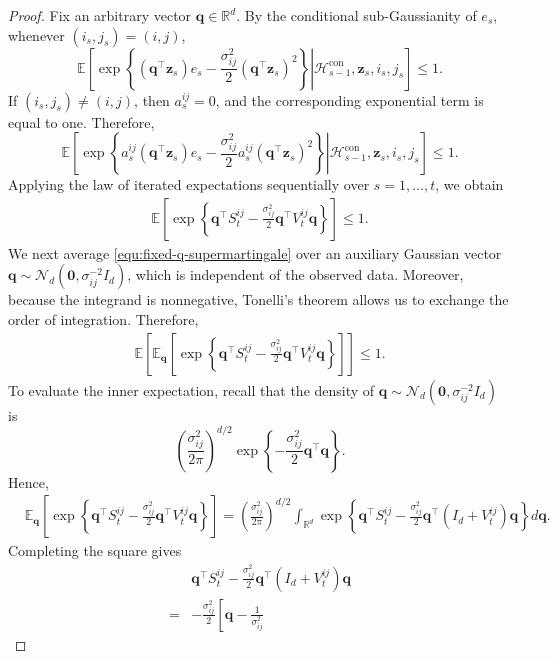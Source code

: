 \documentclass[12pt]{article}
\begin{document}
\begin{proof}
Fix an arbitrary vector $\bm q\in\mathbb R^d$. By the conditional
sub-Gaussianity of $e_s$, whenever $(i_s,j_s)=(i,j)$,
\[
\mathbb E\left[
\left.
\exp\left\{
(\bm q^\top\bm z_s)e_s
-
\frac{\sigma_{ij}^2}{2}
(\bm q^\top\bm z_s)^2
\right\}
\right|
\mathcal H_{s-1}^{\mathrm{con}},
\bm z_s,
i_s,
j_s
\right]
\le
1.
\]
If $(i_s,j_s)\neq(i,j)$, then $a_s^{ij}=0$, and the corresponding
exponential term is equal to one. Therefore,
\[
\mathbb E\left[
\left.
\exp\left\{
a_s^{ij}(\bm q^\top\bm z_s)e_s
-
\frac{\sigma_{ij}^2}{2}
a_s^{ij}(\bm q^\top\bm z_s)^2
\right\}
\right|
\mathcal H_{s-1}^{\mathrm{con}},
\bm z_s,
i_s,
j_s
\right]
\le
1.
\]
Applying the law of iterated expectations sequentially over
$s=1,\ldots,t$, we obtain
\begin{align}
\label{equ:fixed-q-supermartingale}
\mathbb E\left[
\exp\left\{
\bm q^\top S_t^{ij}
-
\frac{\sigma_{ij}^2}{2}
\bm q^\top V_t^{ij}\bm q
\right\}
\right]
\le
1.
\end{align}
We next average \eqref{equ:fixed-q-supermartingale} over an auxiliary Gaussian vector $\bm q
\sim
\mathcal N_d
\left(
\bm 0,
\sigma_{ij}^{-2}I_d
\right)$,
which is independent of the observed data. Moreover, because the integrand is nonnegative, Tonelli's theorem allows us to exchange the order of integration. Therefore,
\begin{align}
\label{equ:mixture-expectation}
\mathbb E\left[
\mathbb E_{\bm q}
\left[
\exp\left\{
\bm q^\top S_t^{ij}
-
\frac{\sigma_{ij}^2}{2}
\bm q^\top V_t^{ij}\bm q
\right\}
\right]
\right]
\le
1.
\end{align}
To evaluate the inner expectation, recall that the density of $\bm q\sim\mathcal N_d(\bm 0,\sigma_{ij}^{-2}I_d)$ is
\[
\left(
\frac{\sigma_{ij}^2}{2\pi}
\right)^{d/2}
\exp\left\{
-\frac{\sigma_{ij}^2}{2}
\bm q^\top\bm q
\right\}.
\]
Hence,
\begin{align*}
&
\mathbb E_{\bm q}
\left[
\exp\left\{
\bm q^\top S_t^{ij}
-
\frac{\sigma_{ij}^2}{2}
\bm q^\top V_t^{ij}\bm q
\right\}
\right] =
\left(
\frac{\sigma_{ij}^2}{2\pi}
\right)^{d/2}
\int_{\mathbb R^d}
\exp\left\{
\bm q^\top S_t^{ij}
-
\frac{\sigma_{ij}^2}{2}
\bm q^\top
\left(
I_d+V_t^{ij}
\right)
\bm q
\right\}
d\bm q.
\end{align*}
Completing the square gives
\begin{align*}
&
\bm q^\top S_t^{ij}
-
\frac{\sigma_{ij}^2}{2}
\bm q^\top
\left(
I_d+V_t^{ij}
\right)
\bm q
\\
=&
-\frac{\sigma_{ij}^2}{2}
\left[
\bm q
-
\frac{1}{\sigma_{ij}^2}

\end{align*}
\end{proof}
\end{document}
